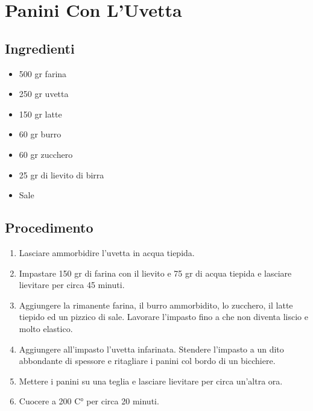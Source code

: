 \section{Panini Con L'Uvetta}
\subsection{Ingredienti}
\begin{itemize}
\item 500 gr farina  
\item 250 gr uvetta  
\item 150 gr latte  
\item 60 gr burro  
\item 60 gr zucchero  
\item 25 gr di lievito di birra  
\item Sale
\end{itemize}
\subsection{Procedimento}
\begin{enumerate}
\item  Lasciare ammorbidire l'uvetta in acqua tiepida.  
\item  Impastare 150 gr di farina con il lievito e 75 gr di acqua tiepida e lasciare lievitare per circa 45 minuti.  
\item  Aggiungere la rimanente farina, il burro ammorbidito, lo zucchero, il latte tiepido ed un pizzico di sale. Lavorare l'impasto fino a che non diventa liscio e molto elastico.  
\item  Aggiungere all'impasto l'uvetta infarinata. Stendere l'impasto a un dito abbondante di spessore e ritagliare i panini col bordo di un bicchiere.  
\item  Mettere i panini su una teglia e lasciare lievitare per circa un'altra ora.  
\item  Cuocere a 200 C° per circa 20 minuti.
\end{enumerate}
